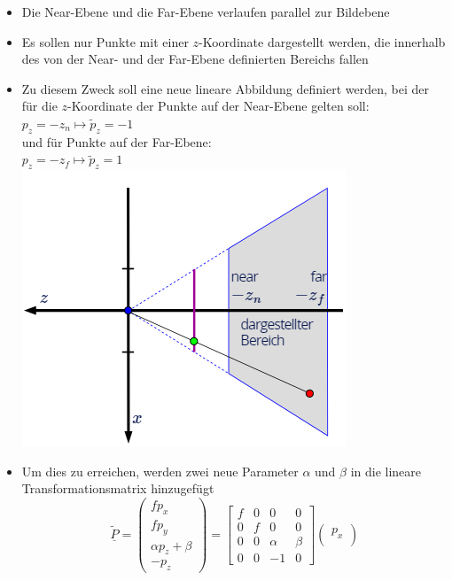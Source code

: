 \documentclass{scrartcl}
\begin{document}
\begin{itemize}
	\item Die Near-Ebene und die Far-Ebene verlaufen parallel zur Bildebene
	\item Es sollen nur Punkte mit einer $z$-Koordinate dargestellt werden, die innerhalb des von der Near- und der Far-Ebene definierten Bereichs fallen
	\item Zu diesem Zweck soll eine neue lineare Abbildung definiert werden, bei der für die $z$-Koordinate der Punkte auf der Near-Ebene gelten soll: \\
	$p_z = -z_n \mapsto \widetilde{p}_z = -1$ \\
	und für Punkte auf der Far-Ebene: \\
	$p_z = -z_f \mapsto \widetilde{p}_z = 1$ \\
	\includegraphics[scale=0.5]{figures/projection_clipping_map.png}
	\item Um dies zu erreichen, werden zwei neue Parameter $\alpha$ und $\beta$ in die lineare Transformationsmatrix hinzugefügt \\
	\begin{equation}
		\underline{\widetilde{P}} = \begin{pmatrix}
		f p_x \\
		f p_y \\
		\alpha p_z + \beta \\
		-p_z
		\end{pmatrix} = \begin{bmatrix}
		f & 0 & 0 & 0 \\
		0 & f & 0 & 0 \\
		0 & 0 & \alpha & \beta \\
		0 & 0 & -1 & 0
		\end{bmatrix} \begin{pmatrix}
		p_x \\

\end{pmatrix}
\end{equation}
\end{itemize}
\end{document}
